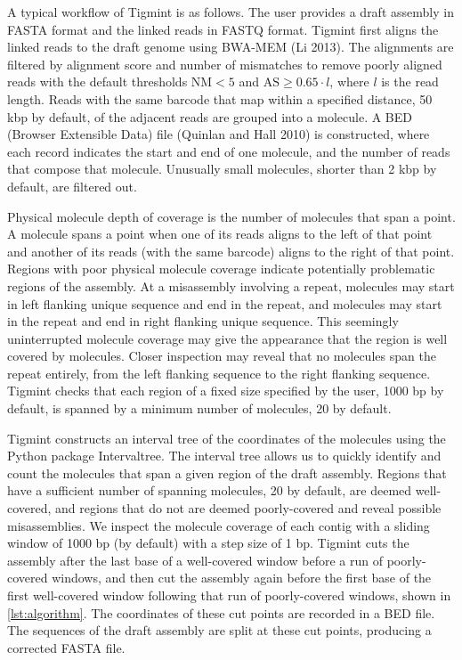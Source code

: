 \documentclass[
  12pt,
  oneside,
  openany]{book}
\begin{document}
A typical workflow of Tigmint is as follows. The user provides a draft assembly in FASTA format and the linked reads in FASTQ format. Tigmint first aligns the linked reads to the draft genome using BWA-MEM (Li 2013). The alignments are filtered by alignment score and number of mismatches to remove poorly aligned reads with the default thresholds \(\textrm{NM} < 5\) and \(\textrm{AS} \geq 0.65 \cdot l\), where \(l\) is the read length. Reads with the same barcode that map within a specified distance, 50 kbp by default, of the adjacent reads are grouped into a molecule. A BED (Browser Extensible Data) file (Quinlan and Hall 2010) is constructed, where each record indicates the start and end of one molecule, and the number of reads that compose that molecule. Unusually small molecules, shorter than 2 kbp by default, are filtered out.

Physical molecule depth of coverage is the number of molecules that span a point. A molecule spans a point when one of its reads aligns to the left of that point and another of its reads (with the same barcode) aligns to the right of that point. Regions with poor physical molecule coverage indicate potentially problematic regions of the assembly. At a misassembly involving a repeat, molecules may start in left flanking unique sequence and end in the repeat, and molecules may start in the repeat and end in right flanking unique sequence. This seemingly uninterrupted molecule coverage may give the appearance that the region is well covered by molecules. Closer inspection may reveal that no molecules span the repeat entirely, from the left flanking sequence to the right flanking sequence. Tigmint checks that each region of a fixed size specified by the user, 1000 bp by default, is spanned by a minimum number of molecules, 20 by default.

Tigmint constructs an interval tree of the coordinates of the molecules using the Python package Intervaltree. The interval tree allows us to quickly identify and count the molecules that span a given region of the draft assembly. Regions that have a sufficient number of spanning molecules, 20 by default, are deemed well-covered, and regions that do not are deemed poorly-covered and reveal possible misassemblies. We inspect the molecule coverage of each contig with a sliding window of 1000 bp (by default) with a step size of 1 bp. Tigmint cuts the assembly after the last base of a well-covered window before a run of poorly-covered windows, and then cut the assembly again before the first base of the first well-covered window following that run of poorly-covered windows, shown in \cref{lst:algorithm}. The coordinates of these cut points are recorded in a BED file. The sequences of the draft assembly are split at these cut points, producing a corrected FASTA file.
\end{document}
